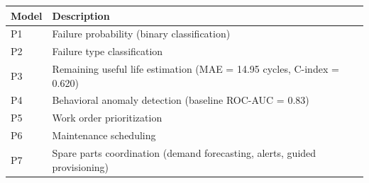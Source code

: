 \vspace{-0.5em}
\begin{small}
\begin{tabularx}{\textwidth}{|l|X|}
\toprule
\textbf{Model} & \textbf{Description} \\
\midrule
P1 & Failure probability (binary classification) \\
\midrule
P2 & Failure type classification \\
\midrule
P3 & Remaining useful life estimation (MAE = 14.95 cycles, C-index = 0.620) \\
\midrule
P4 & Behavioral anomaly detection (baseline ROC-AUC = 0.83) \\
\midrule
P5 & Work order prioritization \\
\midrule
P6 & Maintenance scheduling \\
\midrule
P7 & Spare parts coordination (demand forecasting, alerts, guided provisioning) \\
\bottomrule
\end{tabularx}
\label{tab:metriques-completes}
\end{small}
